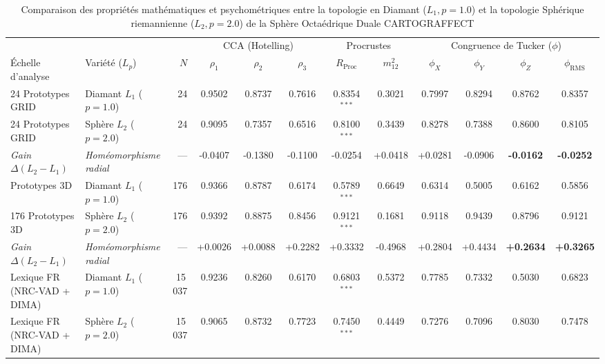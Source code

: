 \begin{table}[htbp]
\centering
\begin{threeparttable}
\caption{Comparaison des propriétés mathématiques et psychométriques entre la topologie en Diamant ($L_1, p = 1.0$) et la topologie Sphérique riemannienne ($L_2, p = 2.0$) de la Sphère Octaédrique Duale CARTOGRAFFECT}
\label{tab:cartograffect_l1_vs_l2_comparison}
\footnotesize
\begin{tabular}{l l r ccc cc cccc}
\toprule
 & & & \multicolumn{3}{c}{CCA (Hotelling)} & \multicolumn{2}{c}{Procrustes} & \multicolumn{4}{c}{Congruence de Tucker ($\phi$)} \\
\cmidrule(lr){4-6} \cmidrule(lr){7-8} \cmidrule(l){9-12}
Échelle d'analyse & Variété ($L_p$) & $N$ & $\rho_1$ & $\rho_2$ & $\rho_3$ & $R_{\text{Proc}}$ & $m_{12}^2$ & $\phi_X$ & $\phi_Y$ & $\phi_Z$ & $\phi_{\text{RMS}}$ \\
\midrule
24 Prototypes GRID & Diamant $L_1$ ($p=1.0$) & 24 & 0.9502 & 0.8737 & 0.7616 & 0.8354$^{***}$ & 0.3021 & 0.7997 & 0.8294 & 0.8762 & 0.8357 \\
24 Prototypes GRID & Sphère $L_2$ ($p=2.0$) & 24 & 0.9095 & 0.7357 & 0.6516 & 0.8100$^{***}$ & 0.3439 & 0.8278 & 0.7388 & 0.8600 & 0.8105 \\
\textit{Gain $\Delta(L_2 - L_1)$} & \textit{Homéomorphisme radial} & --- & -0.0407 & -0.1380 & -0.1100 & -0.0254 & +0.0418 & +0.0281 & -0.0906 & \textbf{-0.0162} & \textbf{-0.0252} \\
\addlinespace[3pt]
176 Prototypes 3D & Diamant $L_1$ ($p=1.0$) & 176 & 0.9366 & 0.8787 & 0.6174 & 0.5789$^{***}$ & 0.6649 & 0.6314 & 0.5005 & 0.6162 & 0.5856 \\
176 Prototypes 3D & Sphère $L_2$ ($p=2.0$) & 176 & 0.9392 & 0.8875 & 0.8456 & 0.9121$^{***}$ & 0.1681 & 0.9118 & 0.9439 & 0.8796 & 0.9121 \\
\textit{Gain $\Delta(L_2 - L_1)$} & \textit{Homéomorphisme radial} & --- & +0.0026 & +0.0088 & +0.2282 & +0.3332 & -0.4968 & +0.2804 & +0.4434 & \textbf{+0.2634} & \textbf{+0.3265} \\
\addlinespace[3pt]
Lexique FR (NRC-VAD + DIMA) & Diamant $L_1$ ($p=1.0$) & 15\,037 & 0.9236 & 0.8260 & 0.6170 & 0.6803$^{***}$ & 0.5372 & 0.7785 & 0.7332 & 0.5030 & 0.6823 \\
Lexique FR (NRC-VAD + DIMA) & Sphère $L_2$ ($p=2.0$) & 15\,037 & 0.9065 & 0.8732 & 0.7723 & 0.7450$^{***}$ & 0.4449 & 0.7276 & 0.7096 & 0.8030 & 0.7478 \\

\end{tabular}
\end{threeparttable}
\end{table}
